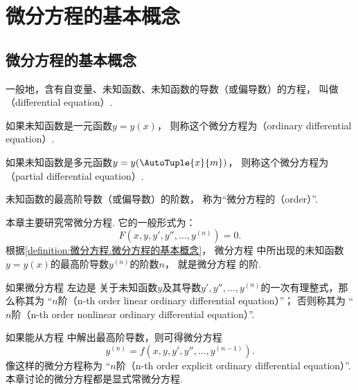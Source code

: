 \section{微分方程的基本概念}
\subsection{微分方程的基本概念}
\begin{definition}\label{definition:微分方程.微分方程的基本概念}
一般地，含有自变量、未知函数、未知函数的导数（或偏导数）的方程，
叫做（differential equation）.

如果未知函数是一元函数\(y = y(x)\)，
则称这个微分方程为（ordinary differential equation）.

如果未知函数是多元函数\(y = y(\AutoTuple{x}{m})\)，
则称这个微分方程为（partial differential equation）.

未知函数的最高阶导数（或偏导数）的阶数，
称为“微分方程的（order）”.
\end{definition}

本章主要研究常微分方程.
它的一般形式为：
\begin{equation}\label{equation:微分方程.微分方程的一般形式}
	F\left( x,y,y',y'',\dotsc,y^{(n)} \right)=0.
\end{equation}
根据\cref{definition:微分方程.微分方程的基本概念}，
微分方程  中所出现的未知函数
\(y = y(x)\)的最高阶导数\(y^{(n)}\)的阶数\(n\)，
就是微分方程  的阶.

如果微分方程  左边是
关于未知函数\(y\)及其导数\(y',y'',\dotsc,y^{(n)}\)的一次有理整式，那么称其为
“\(n\)阶（n-th order linear ordinary differential equation）”；
否则称其为
“\(n\)阶（n-th order nonlinear ordinary differential equation）”.

如果能从方程  中解出最高阶导数，则可得微分方程
\begin{equation}\label{equation:微分方程.分离出最高阶导数}
	y^{(n)} = f\left( x,y,y',y'',\dotsc,y^{(n-1)} \right).
\end{equation}
像这样的微分方程称为
“\(n\)阶（n-th order explicit ordinary differential equation）”.
本章讨论的微分方程都是显式常微分方程.

